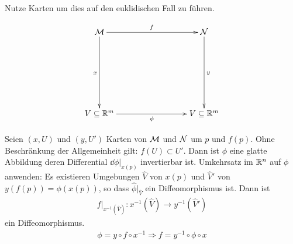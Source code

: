 \begin{bew} \leavevmode
Nutze Karten um dies auf den euklidischen Fall zu führen.

\begin{align}
\begin{xy}
  \xymatrix@=0.25\linewidth{
      \mfk \ar[r]^f \ar[d]_x    &   \mfka \ar[d]^y \\
      V\subseteq \R^m \ar[r]_\phi             &   V\subseteq \R^m    
  }
\end{xy}
\end{align}

Seien $(x, U)$ und $(y, U')$ Karten von $\mathcal{M}$ und $\mathcal{N}$ um $p$ und $f(p)$.
Ohne Beschränkung der Allgemeinheit gilt: $f(U) \subset U'$.
Dann ist $\phi$ eine glatte Abbildung deren Differential $\dd \phi \big\vert_{x(p)}$ invertierbar ist.
Umkehrsatz im $\mathbb{R}^n$ auf $\phi$ anwenden:
Es existieren Umgebungen $\hat{V}$ von $x(p)$ und $\hat{V}'$ von $y(f(p)) = \phi(x(p))$, so dass
$\hat{\phi}\big\vert_{\hat{V}}$ ein Diffeomorphismus ist.
Dann ist
\begin{align}
f\big\vert_{x^{-1}(\hat{V})}: x^{-1}(\hat{V}) \to y^{-1}(\hat{V}')
\end{align}
ein Diffeomorphismus.
\begin{align}
\phi = y \circ f \circ x^{-1} \Rightarrow f = y^{-1} \circ \phi \circ x
\end{align}
\end{bew}


